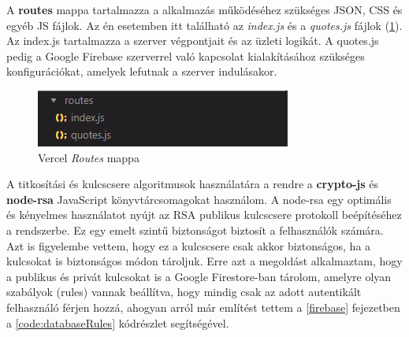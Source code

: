 A \textbf{routes} mappa tartalmazza a alkalmazás működéséhez szükséges JSON, CSS és egyéb JS fájlok. Az én esetemben itt található az \textit{index.js} és a \textit{quotes.js} fájlok (\ref{abra:vercelRoutes}). Az index.js tartalmazza a szerver végpontjait és az üzleti logikát. A quotes.js pedig a Google Firebase szerverrel való kapcsolat kialakításához szükséges konfigurációkat, amelyek lefutnak a szerver indulásakor.

\begin{figure}[!h]
	\centering
	\includegraphics[scale=0.8]{images/vercelRoutes}
	\caption{Vercel \textit{Routes} mappa}
	\label{abra:vercelRoutes}
\end{figure}

A titkosítási és kulcscsere algoritmusok használatára a rendre a \textbf{crypto-js} és \textbf{node-rsa} JavaScript könyvtárcsomagokat használom. A node-rsa egy optimális és kényelmes használatot nyújt az RSA publikus kulcscsere protokoll beépítéséhez a rendszerbe. Ez egy emelt szintű biztonságot biztosít a felhasználók számára. Azt is figyelembe vettem, hogy ez a kulcscsere csak akkor biztonságos, ha a kulcsokat is biztonságos módon tároljuk. Erre azt a megoldást alkalmaztam, hogy a publikus és privát kulcsokat is a Google Firestore-ban tárolom, amelyre olyan szabályok (rules) vannak beállítva, hogy mindig csak az adott autentikált felhasználó férjen hozzá, ahogyan arról már említést tettem a \ref{firebase} fejezetben a \ref{code:databaseRules} kódrészlet segítségével.